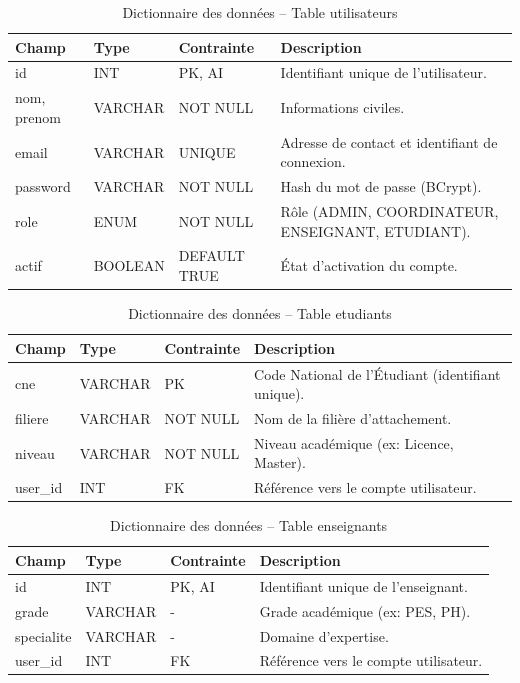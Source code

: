 \documentclass[12pt,a4paper]{article}
\begin{document}
\begin{table}[H]
    \centering
    \small
    \begin{tabular}{lp{2cm}lp{6cm}}
        \toprule
        \rowcolor{primary!10}
        \textbf{Champ} & \textbf{Type} & \textbf{Contrainte} & \textbf{Description} \\
        \midrule
        id & INT & PK, AI & Identifiant unique de l'utilisateur. \\
        nom, prenom & VARCHAR & NOT NULL & Informations civiles. \\
        email & VARCHAR & UNIQUE & Adresse de contact et identifiant de connexion. \\
        password & VARCHAR & NOT NULL & Hash du mot de passe (BCrypt). \\
        role & ENUM & NOT NULL & Rôle (ADMIN, COORDINATEUR, ENSEIGNANT, ETUDIANT). \\
        actif & BOOLEAN & DEFAULT TRUE & État d'activation du compte. \\
        \bottomrule
    \end{tabular}
    \caption{Dictionnaire des données -- Table utilisateurs}
\end{table}

\begin{table}[H]
    \centering
    \small
    \begin{tabular}{lp{2cm}lp{6cm}}
        \toprule
        \rowcolor{primary!10}
        \textbf{Champ} & \textbf{Type} & \textbf{Contrainte} & \textbf{Description} \\
        \midrule
        cne & VARCHAR & PK & Code National de l'Étudiant (identifiant unique). \\
        filiere & VARCHAR & NOT NULL & Nom de la filière d'attachement. \\
        niveau & VARCHAR & NOT NULL & Niveau académique (ex: Licence, Master). \\
        user\_id & INT & FK & Référence vers le compte utilisateur. \\
        \bottomrule
    \end{tabular}
    \caption{Dictionnaire des données -- Table etudiants}
\end{table}

\begin{table}[H]
    \centering
    \small
    \begin{tabular}{lp{2cm}lp{6cm}}
        \toprule
        \rowcolor{primary!10}
        \textbf{Champ} & \textbf{Type} & \textbf{Contrainte} & \textbf{Description} \\
        \midrule
        id & INT & PK, AI & Identifiant unique de l'enseignant. \\
        grade & VARCHAR & - & Grade académique (ex: PES, PH). \\
        specialite & VARCHAR & - & Domaine d'expertise. \\
        user\_id & INT & FK & Référence vers le compte utilisateur. \\
        \bottomrule
    \end{tabular}
    \caption{Dictionnaire des données -- Table enseignants}
\end{table}
\end{document}
